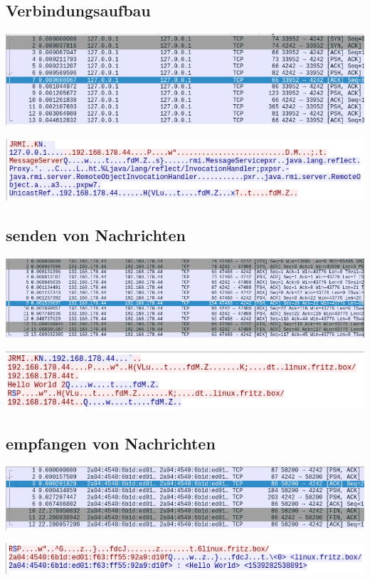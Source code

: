 \documentclass[a4paper, 12pt]{scrartcl}
\begin{document}
\subsection{Verbindungsaufbau}
\begin{center}
	\includegraphics[width=\textwidth]{connect.png}
\end{center}
\begin{center}
	\includegraphics[width=\textwidth]{connect_data.png}
\end{center}

\subsection{senden von Nachrichten}
\begin{center}
	\includegraphics[width=\textwidth]{senden.png}
\end{center}
\begin{center}
	\includegraphics[width=\textwidth]{senden_data.png}
\end{center}

\subsection{empfangen von Nachrichten}
\begin{center}
	\includegraphics[width=\textwidth]{empfangen.png}
\end{center}
\begin{center}
	\includegraphics[width=\textwidth]{empfangen_data.png}
\end{center}
\newpage
\end{document}
